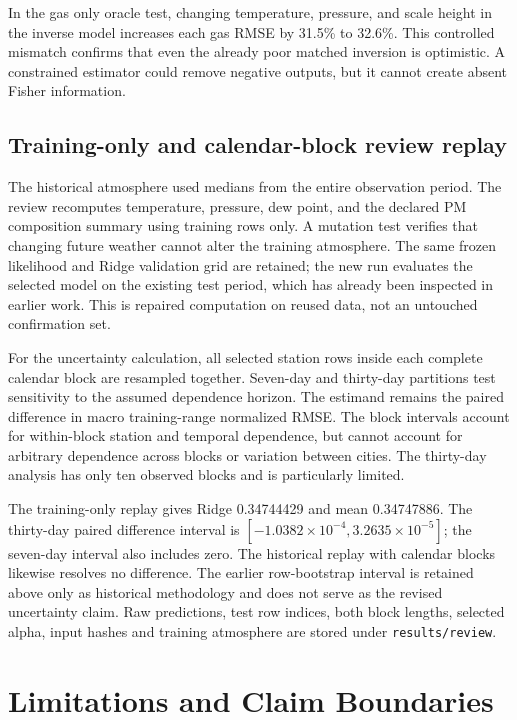 \documentclass[conference]{IEEEtran}
\begin{document}
In the gas only oracle test, changing temperature, pressure, and scale height in the inverse model increases each gas RMSE by 31.5\% to 32.6\%. This controlled mismatch confirms that even the already poor matched inversion is optimistic. A constrained estimator could remove negative outputs, but it cannot create absent Fisher information.

\subsection{Training-only and calendar-block review replay}
The historical atmosphere used medians from the entire observation period. The review recomputes temperature, pressure, dew point, and the declared PM composition summary using training rows only. A mutation test verifies that changing future weather cannot alter the training atmosphere. The same frozen likelihood and Ridge validation grid are retained; the new run evaluates the selected model on the existing test period, which has already been inspected in earlier work. This is repaired computation on reused data, not an untouched confirmation set.

For the uncertainty calculation, all selected station rows inside each complete calendar block are resampled together. Seven-day and thirty-day partitions test sensitivity to the assumed dependence horizon. The estimand remains the paired difference in macro training-range normalized RMSE. The block intervals account for within-block station and temporal dependence, but cannot account for arbitrary dependence across blocks or variation between cities. The thirty-day analysis has only ten observed blocks and is particularly limited.

The training-only replay gives Ridge 0.34744429 and mean 0.34747886. The thirty-day paired difference interval is $[-1.0382\times10^{-4},3.2635\times10^{-5}]$; the seven-day interval also includes zero. The historical replay with calendar blocks likewise resolves no difference. The earlier row-bootstrap interval is retained above only as historical methodology and does not serve as the revised uncertainty claim. Raw predictions, test row indices, both block lengths, selected alpha, input hashes and training atmosphere are stored under \texttt{results/review}.






\section{Limitations and Claim Boundaries}
\end{document}
